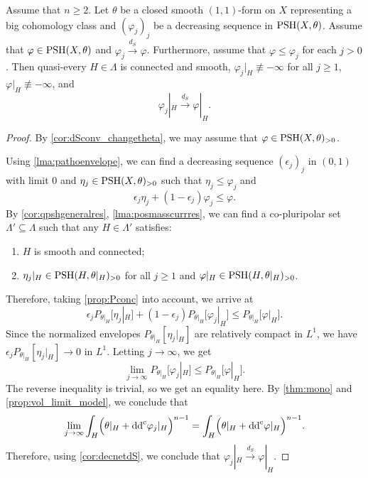 \begin{lemma}\label{lma:Igoodrest}
Assume that $n\geq 2$.
    Let $\theta$ be a closed smooth $(1,1)$-form on $X$ representing a big cohomology class and $(\varphi_j)_j$ be a decreasing sequence in $\mathrm{PSH}(X,\theta)$. Assume that $\varphi\in \mathrm{PSH}(X,\theta)$ and $\varphi_j\xrightarrow{d_S}\varphi$. Furthermore, assume that $\varphi\leq \varphi_j$ for each $j>0$.
    Then quasi-every $H\in \Lambda$ is connected and smooth, $\varphi_j|_H\not\equiv-\infty$ for all $j\geq 1$, $\varphi|_H\not\equiv -\infty$, and
    \[
    \varphi_j|_H\xrightarrow{d_S}\varphi|_H.
    \]
\end{lemma}
\begin{proof}
    By \cref{cor:dSconv_changetheta}, we may assume that $\varphi\in \mathrm{PSH}(X,\theta)_{>0}$.

    Using \cref{lma:pathoenvelope}, we can find a decreasing sequence $(\epsilon_j)_j$ in $(0,1)$ with limit $0$ and $\eta_j\in \mathrm{PSH}(X,\theta)_{>0}$ such that $\eta_j\leq \varphi_j$ and
    \[
    \epsilon_j\eta_j+(1-\epsilon_j)\varphi_j\leq \varphi.
    \]
    By \cref{cor:qpshgeneralres}, \cref{lma:posmasscurrres}, we can find a co-pluripolar set $\Lambda'\subseteq \Lambda$ such that any $H\in \Lambda'$ satisfies:
    \begin{enumerate}
        \item\label{itm:chapter-trace:L1048:1} $H$ is smooth and connected;
        \item\label{itm:chapter-trace:L1048:2} $\eta_j|_H\in \mathrm{PSH}(H,\theta|_H)_{>0}$ for all $j\geq 1$ and $\varphi|_H\in \mathrm{PSH}(H,\theta|_H)_{>0}$.
    \end{enumerate}
    Therefore, taking \cref{prop:Pconc} into account, we arrive at
    \[
    \epsilon_j P_{\theta|_H}\bigl[\eta_j|_H\bigr]+\left(1-\epsilon_j\right)P_{\theta|_H}\bigl[\varphi_j|_H\bigr]\leq P_{\theta|_H}\bigl[\varphi|_H\bigr].
    \]
    Since the normalized envelopes $P_{\theta|_H}[\eta_j|_H]$ are relatively compact in $L^1$, we have $\epsilon_jP_{\theta|_H}[\eta_j|_H]\to 0$ in $L^1$. Letting $j\to\infty$, we get
    \[
    \lim_{j\to\infty} P_{\theta|_H}\bigl[\varphi_j|_H\bigr]\leq P_{\theta|_H}\bigl[\varphi|_H\bigr].
    \]
    The reverse inequality is trivial, so we get an equality here.
    By \cref{thm:mono} and \cref{prop:vol_limit_model}, we conclude that
    \[
    \lim_{j\to\infty}\int_H \Bigl(\theta|_H+\mathrm{dd}^{\mathrm{c}} \varphi_j|_H\Bigr)^{n-1}=\int_H \Bigl(\theta|_H+\mathrm{dd}^{\mathrm{c}} \varphi|_H\Bigr)^{n-1}.
    \]
    Therefore, using \cref{cor:decnetdS}, we conclude that $\varphi_j|_H\xrightarrow{d_S}\varphi|_H$.
\end{proof}


